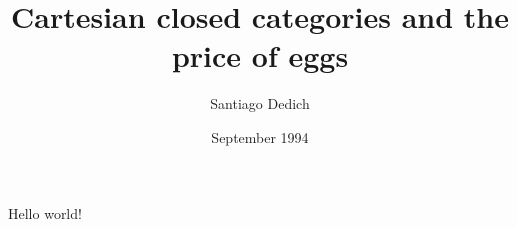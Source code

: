 \documentclass{article}
\title{Cartesian closed categories and the price of eggs}
\author{Santiago Dedich}
\date{September 1994}
\begin{document}
   \maketitle
   Hello world!
\end{document}
